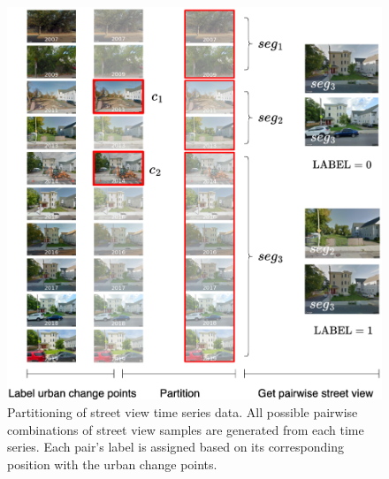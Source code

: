 \begin{figure}
    \centering
    \includegraphics[width=1.01\linewidth]{figure/data_method.png}
    \caption{Partitioning of street view time series data. All possible pairwise combinations of street view samples are generated from each time series. Each pair's label is assigned based on its corresponding position with the urban change points.}
    \label{fig:data_method}
\end{figure}

